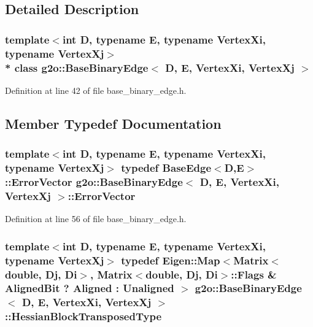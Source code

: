 \subsection{Detailed Description}
\subsubsection*{template$<$int D, typename E, typename Vertex\+Xi, typename Vertex\+Xj$>$\\*
class g2o\+::\+Base\+Binary\+Edge$<$ D, E, Vertex\+Xi, Vertex\+Xj $>$}



Definition at line 42 of file base\+\_\+binary\+\_\+edge.\+h.



\subsection{Member Typedef Documentation}
\subsubsection[{\texorpdfstring{Error\+Vector}{ErrorVector}}]{\setlength{\rightskip}{0pt plus 5cm}template$<$int D, typename E, typename Vertex\+Xi, typename Vertex\+Xj$>$ typedef {\bf Base\+Edge}$<$D,E$>$\+::{\bf Error\+Vector} {\bf g2o\+::\+Base\+Binary\+Edge}$<$ D, E, Vertex\+Xi, Vertex\+Xj $>$\+::{\bf Error\+Vector}}\hypertarget{classg2o_1_1BaseBinaryEdge_ae1cccf6068b2446ece316b6a69a46acf}{}\label{classg2o_1_1BaseBinaryEdge_ae1cccf6068b2446ece316b6a69a46acf}


Definition at line 56 of file base\+\_\+binary\+\_\+edge.\+h.

\subsubsection[{\texorpdfstring{Hessian\+Block\+Transposed\+Type}{HessianBlockTransposedType}}]{\setlength{\rightskip}{0pt plus 5cm}template$<$int D, typename E, typename Vertex\+Xi, typename Vertex\+Xj$>$ typedef Eigen\+::\+Map$<$Matrix$<$double, {\bf Dj}, {\bf Di}$>$, Matrix$<$double, {\bf Dj}, {\bf Di}$>$\+::Flags \& Aligned\+Bit ? Aligned \+: Unaligned $>$ {\bf g2o\+::\+Base\+Binary\+Edge}$<$ D, E, Vertex\+Xi, Vertex\+Xj $>$\+::{\bf Hessian\+Block\+Transposed\+Type}}\hypertarget{classg2o_1_1BaseBinaryEdge_aec0d5b1819f702b7658574fcd6324b49}{}\label{classg2o_1_1BaseBinaryEdge_aec0d5b1819f702b7658574fcd6324b49}


